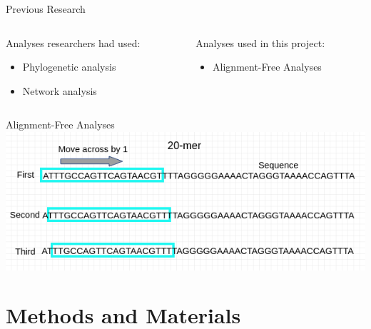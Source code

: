 \documentclass{beamer}
\begin{document}
\begin{frame}{Previous Research}
    \begin{columns}
        \begin{column}{0.5\textwidth}
            \centering
            Analyses researchers had used:
            \begin{itemize}
                \centering
                \item Phylogenetic analysis
                \item Network analysis
            \end{itemize}
        \end{column}
        \begin{column}{0.5\textwidth}
            \centering
            Analyses used in this project:
            \begin{itemize}
                \centering
                \item Alignment-Free Analyses
            \end{itemize}
        \end{column}
    \end{columns}
    
\end{frame}
\begin{frame}{Alignment-Free Analyses}
    \centering
    \includegraphics[scale = 0.7]{alignmentFree.png}
\end{frame}

\section{Methods and Materials}
\end{document}
